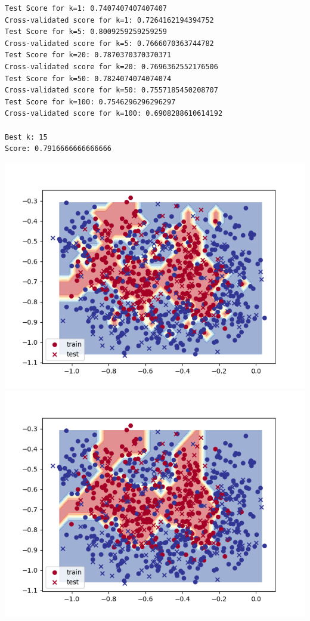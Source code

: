     \begin{verbatim}
Test Score for k=1: 0.7407407407407407
Cross-validated score for k=1: 0.7264162194394752
Test Score for k=5: 0.8009259259259259
Cross-validated score for k=5: 0.7666070363744782
Test Score for k=20: 0.7870370370370371
Cross-validated score for k=20: 0.7696362552176506
Test Score for k=50: 0.7824074074074074
Cross-validated score for k=50: 0.7557185450208707
Test Score for k=100: 0.7546296296296297
Cross-validated score for k=100: 0.6908288610614192

Best k: 15
Score: 0.7916666666666666
    \end{verbatim}

    \includegraphics[width=\textwidth / 2]{plots/kmeans_noisy_boundary_1}
    \includegraphics[width=\textwidth / 2]{plots/kmeans_noisy_boundary_5}
